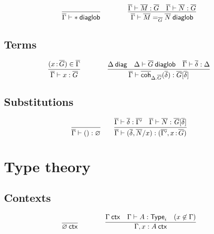 \begin{small}
  \[
  \infer{\wfdiaglob{\diag\Gamma}{\diagbase}}{}
  \qquad\qquad
  \infer
    {\wfdiaglob{\diag\Gamma}{\homj{\diag G}{\diag M}{\diag N}}}
    {\ofdiaglob{\diag\Gamma}{\diag M}{\diag G}
    &\ofdiaglob{\diag\Gamma}{\diag N}{\diag G}}
  \]
\end{small}

\subsection{Terms}

\begin{small}
  \[
  \infer{\ofdiaglob{\diag\Gamma}{x}{\diag G}}
  {(\tptm{x}{\diag G})\in\diag\Gamma}
  \qquad\qquad
  \infer{\ofdiaglob{\diag\Gamma}{\diagcoh{\Delta.\diag G}{\diag\delta}}
    {\diag G[\diag\delta]}}
  {\wfdiag{\Delta} 
    & \wfdiaglob{\Delta}{\diag G}
    & \substdiaglob{\diag\Gamma}{\diag\delta}{\Delta}}
  \]
\end{small}

\subsection{Substitutions}

\begin{small}
  \[
  \infer{\substdiaglob{\diag\Gamma}{()}{\emptyctx}}
  {}
  \qquad
  \infer{\substdiaglob{\diag\Gamma}{(\diag \delta,\diag N/x)}
    {(\diag{\Gamma'},\tptm{x}{\diag G})}}
  {\substdiaglob{\diag\Gamma}{\diag \delta}{\diag{\Gamma'}}
    & \ofdiaglob{\diag\Gamma}{\diag N}{\tsubst{\diag G}{\diag \delta}}}
  \]
\end{small}

\section{Type theory}

\subsection{Contexts}

\begin{small}
  \[
  \infer{\wfctx{\varnothing}}{}
  \qquad\qquad
  \infer{\wfctx{\Gamma,x:A}}
  {\wfctx{\Gamma}
    & \wftype{\Gamma}{A}
    & (x\not\in\Gamma)}
  \]
\end{small}


